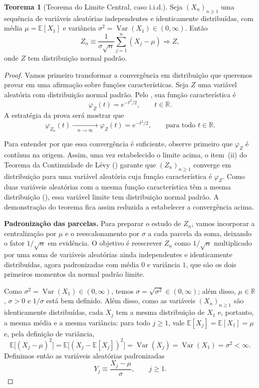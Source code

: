 \documentclass[12pt,portuguese]{article}
\theoremstyle{definition}
\newtheorem{theorem}{Teorema}
\theoremstyle{plainexercise}
\theoremstyle{starredexercise}
\theoremstyle{definition}
\begin{document}
\begin{theorem}[Teorema do Limite Central, caso i.i.d.]\label{thm:man-tlc-iid}
Seja $(X_n)_{n\geqslant1}$ uma sequência de variáveis aleatórias
independentes e identicamente distribuídas, com média
$\mu=\mathbb{E}[X_1]$ e variância
$\sigma^2=\operatorname{Var}(X_1)\in(0,\infty)$.
Então
\[
Z_n\equiv\frac{1}{\sigma\sqrt{n}}\sum_{j=1}^n(X_j-\mu)
\Rightarrow Z,
\]
onde $Z$ tem distribuição normal padrão.
\end{theorem}

\begin{proof}
Vamos primeiro transformar a convergência em distribuição que queremos
provar em uma afirmação sobre funções características. Seja $Z$ uma
variável aleatória com distribuição normal padrão. Pelo
, sua função característica é
\[
\varphi_Z(t)=e^{-t^2/2},
\qquad t\in\mathbb{R}.
\]
A estratégia da prova será mostrar que
\[
\varphi_{Z_n}(t)
\xrightarrow[\quad n\to\infty\quad]{}
\varphi_Z(t)=e^{-t^2/2},
\qquad\text{para todo }t\in\mathbb{R}.
\]

Para entender por que essa convergência é suficiente, observe primeiro
que $\varphi_Z$ é contínua na origem. Assim, uma vez estabelecido o
limite acima, o item~(ii) do Teorema da Continuidade de Lévy
() garante que $(Z_n)_{n\geqslant1}$
converge em distribuição para uma variável aleatória cuja função
característica é $\varphi_Z$. Como duas variáveis aleatórias com a
mesma função característica têm a mesma distribuição (),
essa variável limite
tem distribuição normal padrão. A demonstração do teorema fica assim
reduzida a estabelecer a convergência acima.

\smallskip
\noindent\textbf{Padronização das parcelas.}
Para preparar o estudo de $Z_n$, vamos incorporar a centralização por $\mu$
e o reescalonamento por $\sigma$ a cada parcela da soma, deixando o fator
$1/\sqrt{n}$ em evidência. O objetivo é reescrever $Z_n$ como $1/\sqrt{n}$
multiplicado por uma soma de variáveis aleatórias ainda independentes e
identicamente distribuídas, agora padronizadas com média $0$ e variância $1$,
que são os dois primeiros momentos da normal padrão limite.

Como $\sigma^2=\operatorname{Var}(X_1)\in(0,\infty)$, temos
$\sigma=\sqrt{\sigma^2}\in(0,\infty)$; além disso, $\mu\in\mathbb{R}$,
$\sigma>0$ e $1/\sigma$ está bem definido. Além disso, como as variáveis
$(X_n)_{n\geqslant1}$ são identicamente distribuídas, cada $X_j$ tem a
mesma distribuição de $X_1$ e, portanto, a mesma média e a mesma variância:
para todo $j\geqslant1$, vale $\mathbb{E}[X_j]=\mathbb{E}[X_1]=\mu$ e,
pela definição de variância,
\[
\mathbb{E}\bigl[(X_j-\mu)^2\bigr]
=\mathbb{E}\bigl[(X_j-\mathbb{E}[X_j])^2\bigr]
=\operatorname{Var}(X_j)
=\operatorname{Var}(X_1)
=\sigma^2<\infty.
\]
Definimos então as variáveis aleatórias padronizadas
\[
Y_j\equiv\frac{X_j-\mu}{\sigma},
\qquad j\geqslant1.
\]


\end{proof}
\end{document}
